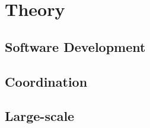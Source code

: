 \chapter{Theory}

\minitoc

\newpage

\section{Software Development}

\section{Coordination}

\section{Large-scale}